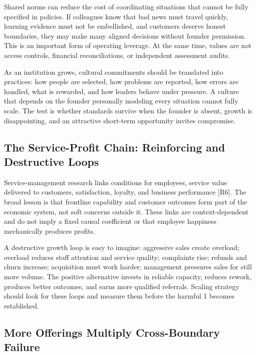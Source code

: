 Shared norms can reduce the cost of coordinating situations that cannot be fully specified in policies. If colleagues know that bad news must travel quickly, learning evidence must not be embellished, and customers deserve honest boundaries, they may make many aligned decisions without founder permission. This is an important form of operating leverage. At the same time, values are not access controls, financial reconciliations, or independent assessment audits.

As an institution grows, cultural commitments should be translated into practices: how people are selected, how problems are reported, how errors are handled, what is rewarded, and how leaders behave under pressure. A culture that depends on the founder personally modeling every situation cannot fully scale. The test is whether standards survive when the founder is absent, growth is disappointing, and an attractive short-term opportunity invites compromise.

\subsection{The Service-Profit Chain: Reinforcing and Destructive Loops}
\label{sec:service_profit_chain_loops}

Service-management research links conditions for employees, service value delivered to customers, satisfaction, loyalty, and business performance [R6]. The broad lesson is that frontline capability and customer outcomes form part of the economic system, not soft concerns outside it. These links are context-dependent and do not imply a fixed causal coefficient or that employee happiness mechanically produces profits.

A destructive growth loop is easy to imagine: aggressive sales create overload; overload reduces staff attention and service quality; complaints rise; refunds and churn increase; acquisition must work harder; management pressures sales for still more volume. The positive alternative invests in reliable capacity, reduces rework, produces better outcomes, and earns more qualified referrals. Scaling strategy should look for these loops and measure them before the harmful 1 becomes established.

\subsection{More Offerings Multiply Cross-Boundary Failure}
\label{sec:offerings_multiply_cross_boundary}

